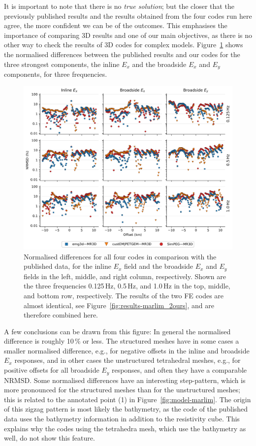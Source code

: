 \documentclass[extra, camera,%
]{gji}
\newlength{\fwidth}
\begin{document}
It is important to note that there is no \emph{true solution}; but the closer that the previously published results and the results obtained from the four codes run here agree, the more confident we can be of the outcomes. This emphasises the importance of comparing 3D results and one of our main objectives, as there is no other way to check the results of 3D codes for complex models. Figure~\ref{fig:results-marlim_2published} shows the normalised differences between the published results and our codes for the three strongest components, the inline $E_x$ and the broadside $E_x$ and $E_y$ components, for three frequencies.
%
\begin{figure}
  \centering
  \includegraphics[width=.9\fwidth]{figures/results-marlim_2published.png}
  \caption{Normalised differences for all four codes in comparison with the published data, for the inline $E_x$ field and the broadside $E_x$ and $E_y$ fields in the left, middle, and right column, respectively. Shown are the three frequencies 0.125\,Hz, 0.5\,Hz, and 1.0\,Hz in the top, middle, and bottom row, respectively. The results of the two FE codes are almost identical, see Figure~\ref{fig:results-marlim_2ours}, and are therefore combined here.}
  \label{fig:results-marlim_2published}
\end{figure}
%
A few conclusions can be drawn from this figure: In general the normalised difference is roughly 10\,\% or less. The structured meshes have in some cases a smaller normalised difference, e.g., for negative offsets in the inline and broadside $E_x$ responses, and in other cases the unstructured tetrahedral meshes, e.g., for positive offsets for all broadside $E_y$ responses, and often they have a comparable NRMSD. Some normalised differences have an interesting step-pattern, which is more pronounced for the structured meshes than for the unstructured meshes; this is related to the annotated point (1) in Figure~\ref{fig:model-marlim}. The origin of this zigzag pattern is most likely the bathymetry, as the code of the published data uses the bathymetry information in addition to the resistivity cube. This explains why the codes using the tetrahedra mesh, which use the bathymetry as well, do not show this feature.
\end{document}

